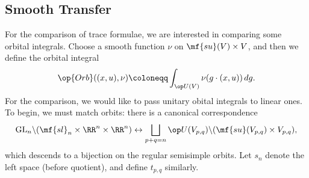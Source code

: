 \documentclass{article}
\begin{document}
\subsection{Smooth Transfer}
For the comparison of trace formulae, we are interested in comparing some orbital integrals. Choose a smooth function $\nu$ on $\mf{su}(V)\times V$, and then we define the orbital integral
\[\op{Orb}((x,u),\nu)\coloneqq\int_{\op U(V)}\nu(g\cdot(x,u))\,dg.\]
For the comparison, we would like to pass unitary obital integrals to linear ones. To begin, we must match orbits: there is a canonical correspondence
\[\mathrm{GL}_n\backslash(\mf{sl}_n\times\RR^n\times\RR^n)\leftrightarrow\bigsqcup_{p+q=n}\op U(V_{p,q})\backslash(\mf{su}(V_{p,q})\times V_{p,q}),\]
which descends to a bijection on the regular semisimple orbits. Let $s_n$ denote the left space (before quotient), and define $t_{p,q}$ similarly.
\end{document}
